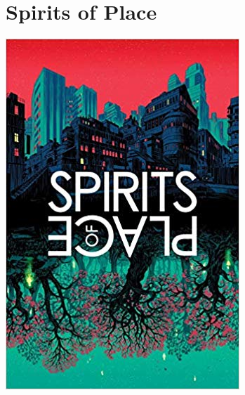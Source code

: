 \documentclass{tufte-handout}
\makeatletter
\newcommand{\varcaption}[2][0pt]{%
  \gsetlength{\@tufte@caption@vertical@offset}{-#1}%
  \gdef\@tufte@stored@varcaption{#2}%
}
\gdef\@tufte@stored@varcaption{} %
\makeatother
\begin{document}
\section*{Spirits of Place}
\begin{marginfigure}[\baselineskip]
   \includegraphics[width=\linewidth]{images/spirits_of_place.jpg}
   \varcaption{\href{https://www.dailygrail.com/2016/12/spirits-of-place-featuring-alan-moore-warren-ellis-and-many-more/}{Publisher Link}, \href{https://www.amazon.com/Spirits-Place-Alan-Moore/dp/0994617631/}{Amazon Link}}
\end{marginfigure}
\end{document}
